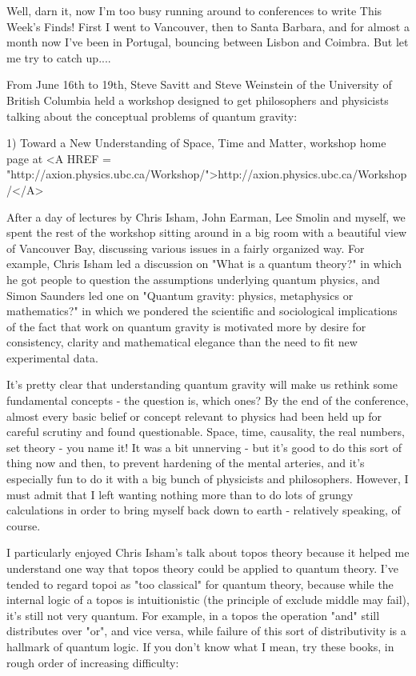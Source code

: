 


Well, darn it, now I'm too busy running around to conferences to write
This Week's Finds!  First I went to Vancouver, then to Santa Barbara, 
and for almost a month now I've been in Portugal, bouncing between 
Lisbon and Coimbra.  But let me try to catch up.... 

From June 16th to 19th, Steve Savitt and Steve Weinstein of the 
University of British Columbia held a workshop designed to get 
philosophers and physicists talking about the conceptual problems 
of quantum gravity:

1) Toward a New Understanding of Space, Time and Matter, workshop
home page at <A HREF = "http://axion.physics.ubc.ca/Workshop/">http://axion.physics.ubc.ca/Workshop/</A>

After a day of lectures by Chris Isham, John Earman, Lee Smolin and
myself, we spent the rest of the workshop sitting around in a big
room with a beautiful view of Vancouver Bay, discussing various issues 
in a fairly organized way.   For example, Chris Isham led a discussion 
on "What is a quantum theory?" in which he got people to question the 
assumptions underlying quantum physics, and Simon Saunders led one on 
"Quantum gravity: physics, metaphysics or mathematics?" in which we 
pondered the scientific and sociological implications of the fact that 
work on quantum gravity is motivated more by desire for consistency, 
clarity and mathematical elegance than the need to fit new experimental 
data.   

It's pretty clear that understanding quantum gravity will make us rethink 
some fundamental concepts - the question is, which ones?  By the end of 
the conference, almost every basic belief or concept relevant to physics 
had been held up for careful scrutiny and found questionable.  Space, 
time, causality, the real numbers, set theory - you name it!  It was a 
bit unnerving - but it's good to do this sort of thing now and then, to 
prevent hardening of the mental arteries, and it's especially fun to do 
it with a big bunch of physicists and philosophers.  However, I must 
admit that I left wanting nothing more than to do lots of grungy 
calculations in order to bring myself back down to earth - relatively
speaking, of course.

I particularly enjoyed Chris Isham's talk about topos theory because 
it helped me understand one way that topos theory could be applied to 
quantum theory.  I've tended to regard topoi as "too classical" for 
quantum theory, because while the internal logic of a topos is
intuitionistic (the principle of exclude middle may fail), it's
still not very quantum.   For example, in a topos the operation 
"and" still distributes over "or", and vice versa, while failure 
of this sort of distributivity is a hallmark of quantum logic.  If
you don't know what I mean, try these books, in rough order of
increasing difficulty: 

